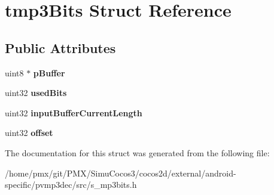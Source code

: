 \hypertarget{structtmp3Bits}{}\section{tmp3\+Bits Struct Reference}
\label{structtmp3Bits}
\subsection*{Public Attributes}
\begin{DoxyCompactItemize}
\item 
\mbox{\label{structtmp3Bits_adc31f1a775cdc88e3d866b9d3f2d6fff}} 
uint8 $\ast$ {\bfseries p\+Buffer}
\item 
\mbox{\label{structtmp3Bits_a082ff01372d30f813f7b0bdc6ee618c7}} 
uint32 {\bfseries used\+Bits}
\item 
\mbox{\label{structtmp3Bits_aa6ab388cab7e9eee0739490b490058a8}} 
uint32 {\bfseries input\+Buffer\+Current\+Length}
\item 
\mbox{\label{structtmp3Bits_a0c29803b3036624e6aaccb3b23d01a1c}} 
uint32 {\bfseries offset}
\end{DoxyCompactItemize}


The documentation for this struct was generated from the following file\+:\begin{DoxyCompactItemize}
\item 
/home/pmx/git/\+P\+M\+X/\+Simu\+Cocos3/cocos2d/external/android-\/specific/pvmp3dec/src/s\+\_\+mp3bits.\+h\end{DoxyCompactItemize}
